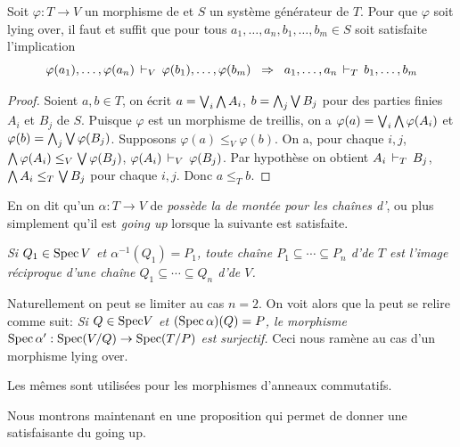 \begin{lemma} \label{lemLYO}
Soit $\varphi:T\to V$ un morphisme de \trdis et $S$ un système générateur de $T$. Pour que $\varphi$ soit lying over, il faut et suffit que pour tous
$a_1,\dots,a_n,b_1,\dots,b_m\in S$ soit satisfaite l'implication
$$
\varphi(a_1),\dots,\varphi(a_n)\,\vdash_{V}\, \varphi(b_1),\dots,\varphi(b_m)
\;\;\Rightarrow\;\;
a_1,\dots,a_n\,\vdash_{T}\, b_1,\dots,b_m
$$ 
\end{lemma}
%
\begin{proof}
Soient $a,b\in T$, on écrit $a=\bigvee_i \bigwedge A_i$, $b=\bigwedge_j \bigvee B_j$
pour des parties finies $A_i$ et $B_j$ de $S$.
Puisque $\varphi$ est un morphisme de treillis, on a $\varphi(a)=\bigvee_i \bigwedge \varphi(A_i)$ et $\varphi(b)=\bigwedge_j \bigvee \varphi(B_j)$.
Supposons $\varphi(a)\leq_V \varphi(b)$. On a, pour chaque $i,j$, $\bigwedge \varphi(A_i)\leq_V \bigvee\varphi(B_j)$, \cad 
$\varphi(A_i)\,\vdash_{V}\, \varphi(B_j)$. Par hypothèse on obtient $A_i\,\vdash_{T}\, B_j$, \cad $\bigwedge A_i\leq_T \bigvee B_j$
pour chaque $i,j$. Donc $a\leq _T b$. 
\end{proof}
%

\label{subsecGu}
En \clama on dit qu'un \homo $\alpha: T\to V$ de \trdis \emph{poss\`ede la \prt de montée pour les chaînes d'\ideps}, ou plus simplement qu'il est \emph{going up} lorsque  la \prt suivante est satisfaite.

\emph{Si $ Q _1\in{\rm Spec}\, V$ et $\alpha^{-1}( Q _1)= P _1$, toute chaîne $P_1\subseteq\cdots\subseteq P_n$ d'\ideps de $T$ 
est l'image réciproque d'une  chaîne $Q_1\subseteq\cdots\subseteq Q_n$ d'\ideps de $V$.
}


\smallskip Naturellement on peut se limiter au cas $n=2$.
On voit alors que la \dfn peut se relire comme suit: \emph{Si $ Q \in{\rm Spec} V$ et 
$({\rm Spec}\,\alpha)(Q)=P$, le morphisme ${\rm Spec}\,\alpha':{\rm Spec}( V/ Q )\to{\rm Spec}( T/ P )$ est surjectif.} Ceci nous ramène au cas d'un morphisme lying over.

Les mêmes \dfns sont utilisées pour les morphismes d'anneaux commutatifs.

Nous montrons maintenant en \clama une proposition qui permet de donner une
\dfn \cov satisfaisante du going up.

